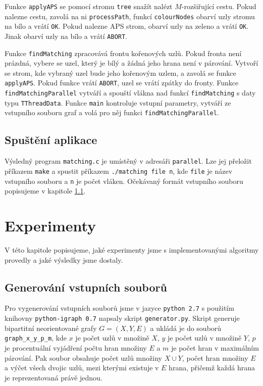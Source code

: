 \documentclass[a4paper, 11pt, titlepage, final]{article}[3. prosinec 2011]
\begin{document}
Funkce \texttt{applyAPS} se pomocí stromu \texttt{tree} snažít nalézt $M$-rozšiřující cestu. Pokud nalezne cestu, zavolá na ni \texttt{processPath}, funkcí \texttt{colourNodes} obarví uzly stromu na bílo a vrátí \texttt{OK}. Pokud nalezne APS strom, obarví uzly na zeleno a vrátí \texttt{OK}. Jinak obarví uzly na bílo a vrátí \texttt{ABORT}.

Funkce \texttt{findMatching} zpracovává frontu kořenových uzlů. Pokud fronta není prázdná, vybere se uzel, který je bílý a žádná jeho hrana není v párování. Vytvoří se strom, kde vybraný uzel bude jeho kořenovým uzlem, a zavolá se funkce \texttt{applyAPS}. Pokud funkce vrátí \texttt{ABORT}, uzel se vrátí zpátky do fronty. Funkce \texttt{findMatchingParallel} vytváří a spouští vlákna nad funkcí \texttt{findMatching} s daty typu \texttt{TThreadData}. Funkce \texttt{main} kontroluje vstupní parametry, vytváří ze vstupního souboru graf a volá pro něj funkci \texttt{findMatchingParallel}.

\subsection{Spuštění aplikace}

Výsledný program \texttt{matching.c} je umístěný v adresáři \texttt{parallel}. Lze jej přeložit příkazem \texttt{make} a spustit příkazem \texttt{./matching file n}, kde \texttt{file} je název vstupního souboru a \texttt{n} je počet vláken. Očekávaný formát vstupního souboru popisujeme v kapitole \ref{secGenerating}.

\section{Experimenty} \label{secExperiment}

V této kapitole popisujeme, jaké experimenty jsme s implementovanými algoritmy provedly a jaké výsledky jsme dostaly.

\subsection{Generování vstupních souborů} \label{secGenerating}

Pro vygenerování vstupních souborů jsme v jazyce \texttt{python 2.7} s použitím knihovny \texttt{python-igraph 0.7} \cite{igraph:2003} napsaly skript \texttt{generator.py}. 
Skript generuje bipartitní neorientované grafy $G=(X,Y,E)$ a ukládá je do souborů \texttt{graph\_x\_y\_p\_m}, kde $x$ je počet uzlů v množině $X$, $y$ je počet uzlů v množině $Y$, $p$ je procentuální vyjádření počtu hran množiny $E$ a $m$ je počet hran v maximálním párování. Pak soubor obsahuje počet uzlů množiny $X \cup Y$, počet hran množiny $E$ a výčet všech dvojic uzlů, mezi kterými existuje v $E$ hrana, přičemž každá hrana je reprezentovaná právě jednou.
\end{document}
